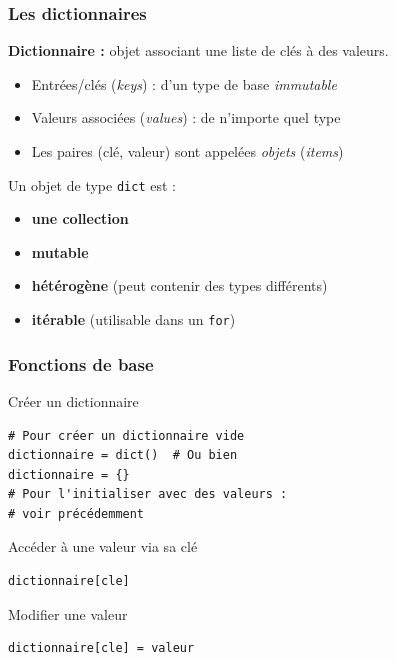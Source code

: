 \documentclass[x11names,svgnames]{beamer}
\begin{document}
\begin{frame}[fragile]
  \frametitle{Les dictionnaires}

\textbf{Dictionnaire :} objet associant une liste de clés à des valeurs.

\begin{itemize}
      \item Entrées/clés (\emph{keys}) : d'un type de base \emph{immutable}
      \item Valeurs associées (\emph{values}) : de n'importe quel type
      \item Les paires (clé, valeur) sont appelées \emph{objets} (\emph{items})
      \end{itemize}

Un objet de type \texttt{dict} est :
\begin{itemize}
\item \textbf{une collection}
\item \textbf{mutable}
\item \textbf{hétérogène} (peut contenir des types différents)
\item \textbf{itérable} (utilisable dans un \texttt{for})
\end{itemize}

\end{frame}

\begin{frame}[fragile]
  \frametitle{Fonctions de base}

  \begin{block}{Créer un dictionnaire}
  \begin{mdframed}[roundcorner=5pt]
\begin{verbatim}
# Pour créer un dictionnaire vide
dictionnaire = dict()  # Ou bien
dictionnaire = {}
# Pour l'initialiser avec des valeurs :
# voir précédemment
\end{verbatim}
  \end{mdframed}
  \end{block}

  \begin{block}{Accéder à une valeur via sa clé}
  \begin{mdframed}[roundcorner=5pt]
\begin{verbatim}
dictionnaire[cle]
\end{verbatim}
  \end{mdframed}
  \end{block}

  \begin{block}{Modifier une valeur}
  \begin{mdframed}[roundcorner=5pt]
\begin{verbatim}
dictionnaire[cle] = valeur
\end{verbatim}
  \end{mdframed}
\end{block}
\end{frame}
\end{document}
